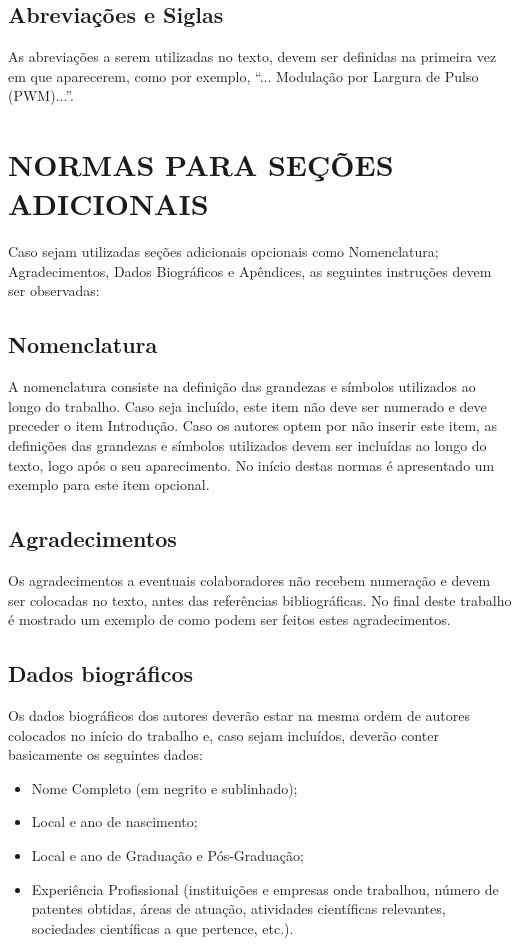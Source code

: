 \documentclass{ceel}
\begin{document}
\begin{multicols}{2}
\subsection{ Abreviações e Siglas}
As abreviações a serem utilizadas no texto, devem ser definidas na primeira vez em que aparecerem, como por exemplo, “... Modulação por Largura de Pulso (PWM)...”.
\section{NORMAS PARA SEÇÕES ADICIONAIS}

Caso sejam utilizadas seções adicionais opcionais como Nomenclatura; Agradecimentos, Dados Biográficos e Apêndices, as seguintes instruções devem ser observadas:
\subsection{Nomenclatura} 
A nomenclatura consiste na definição das grandezas e símbolos utilizados ao longo do trabalho. Caso seja incluído, este item não deve ser numerado e deve preceder o item Introdução. Caso os autores optem por não inserir este item, as definições das grandezas e símbolos utilizados devem ser incluídas ao longo do texto, logo após o seu aparecimento. No início destas normas é apresentado um exemplo para este item opcional.
\subsection{Agradecimentos}
Os agradecimentos a eventuais colaboradores não recebem numeração e devem ser colocadas no texto, antes das referências bibliográficas. No final deste trabalho é mostrado um exemplo de como podem ser feitos estes agradecimentos.
\subsection{Dados biográficos}
Os dados biográficos dos autores deverão estar na mesma ordem de autores colocados no início do trabalho e, caso sejam incluídos, deverão conter basicamente os seguintes dados:
\begin{itemize}
\item Nome Completo (em negrito e sublinhado);
\item	Local e ano de nascimento;
\item	Local e ano de Graduação e Pós-Graduação;
\item	Experiência Profissional (instituições e empresas onde trabalhou, número de patentes obtidas, áreas de atuação, atividades científicas relevantes, sociedades científicas a que pertence, etc.).
\end{itemize}

\end{multicols}
\end{document}
